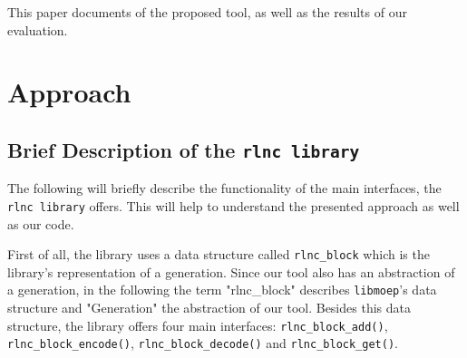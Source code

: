 \documentclass[a4paper,english,10pt]{tumarticle}
\begin{document}
This paper documents of the proposed tool, as well as the results of our evaluation.

\section{Approach}\label{app}

\subsection{Brief Description of the \texttt{rlnc library}}\label{app:desc}
The following will briefly describe the functionality of the main interfaces, the \texttt{rlnc library} offers.
This will help to understand the presented approach as well as our code.

First of all, the library uses a data structure called \texttt{rlnc\_block} which is the library's representation of a generation.
Since our tool also has an abstraction of a generation, in the following the term "rlnc\_block" describes \texttt{libmoep}'s data structure and 
"Generation" the abstraction of our tool. Besides this data structure, the library offers four main interfaces: 
\texttt{rlnc\_block\_add()}, \texttt{rlnc\_block\_encode()}, \texttt{rlnc\_block\_decode()} and \texttt{rlnc\_block\_get()}.
\end{document}
